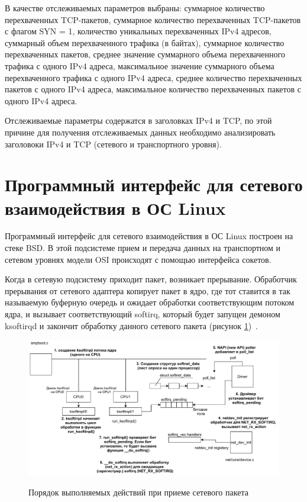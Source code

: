 \documentclass{bmstu}
\begin{document}

В качестве отслеживаемых параметров выбраны: суммарное количество перехваченных TCP-пакетов, суммарное количество перехваченных TCP-пакетов с флагом SYN = 1, количество уникальных перехваченных IPv4 адресов, суммарный объем перехваченного трафика (в байтах), суммарное количество перехваченных пакетов, среднее значение суммарного объема перехваченного трафика с одного IPv4 адреса, максимальное значение суммарного объема перехваченного трафика с одного IPv4 адреса, среднее количество перехваченных пакетов с одного IPv4 адреса, максимальное количество перехваченных пакетов с одного IPv4 адреса.


Отслеживаемые параметры содержатся в заголовках IPv4 и TCP, по этой причине для получения отслеживаемых данных необходимо анализировать заголовоки IPv4 и TCP (сетевого и транспортного уровня).

\section{Программный интерфейс для сетевого взаимодействия в ОС Linux}
Программный интерфейс для сетевого взаимодействия в ОС Linux построен на стеке BSD. В этой подсистеме прием и передача данных на транспортном и сетевом уровнях модели OSI происходят с помощью интерфейса сокетов.

Когда в сетевую подсистему приходит пакет, возникает прерывание. Обработчик прерывания от сетевого адаптера копирует пакет в ядро, где тот ставится в так называемую буферную очередь и ожидает обработки соответствующим потоком ядра, и вызывает соответствующий softirq, который будет запущен демоном ksoftirqd и закончит обработку данного сетевого пакета (рисунок \ref{img:softirq})~\cite{ryaz}. 

\newpage
\begin{figure}[h]
	\centering
	\begin{center}
		{\includegraphics[scale=0.7]{inc/img/daemon.pdf}}
		\caption{Порядок выполняемых действий при приеме сетевого пакета}
		\label{img:softirq}
	\end{center}
\end{figure} 
\end{document}
